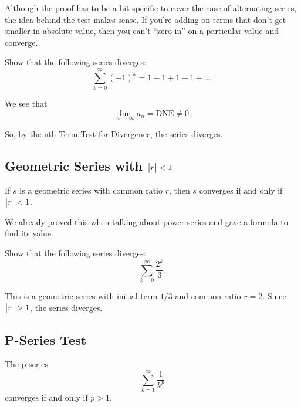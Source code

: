 Although the proof has to be a bit specific to cover the case of alternating series, the idea behind the test makes sense.
If you're adding on terms that don't get smaller in absolute value, then you can't ``zero in'' on a particular value and converge.

\begin{example}
	Show that the following series diverges:
	\begin{equation*}
		\sum_{k=0}^{\infty}{(-1)^k} = 1 - 1 + 1 - 1 + \ldots.
	\end{equation*}
\end{example}
\begin{answer}
	We see that
	\begin{equation*}
		\lim_{n\to\infty}{a_n} = \text{DNE} \neq 0.
	\end{equation*}
	
	So, by the nth Term Test for Divergence, the series diverges.
\end{answer}

\subsection{Geometric Series with $\big\lvert r \big\rvert < 1$}
\begin{lemma}
	If $s$ is a geometric series with common ratio $r$, then $s$ converges if and only if $\big\lvert r \big\rvert < 1$.
\end{lemma}

We already proved this when talking about power series and gave a formula to find its value.

\begin{example}
	Show that the following series diverges:
	\begin{equation*}
		\sum_{k=0}^{\infty}{\frac{2^k}{3}}.
	\end{equation*}	
\end{example}
\begin{answer}
	This is a geometric series with initial term $1/3$ and common ratio $r=2$.
	Since $\big\lvert r \big\rvert > 1$, the series diverges.
\end{answer}

\subsection{P-Series Test}
\begin{lemma}
	The p-series
	\begin{equation*}
		\sum_{k=1}^{\infty}{\frac{1}{k^p}}
	\end{equation*}
	converges if and only if $p > 1$.
\end{lemma}

